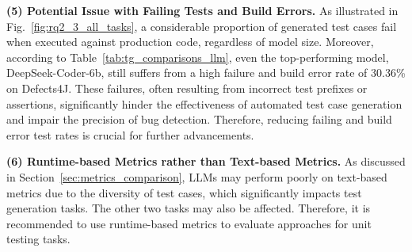 \textbf{(5) Potential Issue with Failing Tests and Build Errors.}
As illustrated in Fig.~\ref{fig:rq2_3_all_tasks}, a considerable proportion of generated test cases fail when executed against production code, regardless of model size.
Moreover, according to Table~\ref{tab:tg_comparisons_llm}, even the top-performing model, DeepSeek-Coder-6b, still suffers from a high failure and build error rate of 30.36\% on Defects4J.
These failures, often resulting from incorrect test prefixes or assertions, significantly hinder the effectiveness of automated test case generation and impair the precision of bug detection. 
Therefore, reducing failing and build error test rates is crucial for further advancements.


\textbf{(6) Runtime-based Metrics rather than Text-based Metrics.}
As discussed in Section~\ref{sec:metrics_comparison}, LLMs may perform poorly on text-based metrics due to the diversity of test cases, which significantly impacts test generation tasks. The other two tasks may also be affected. Therefore, it is recommended to use runtime-based metrics to evaluate approaches for unit testing tasks.


